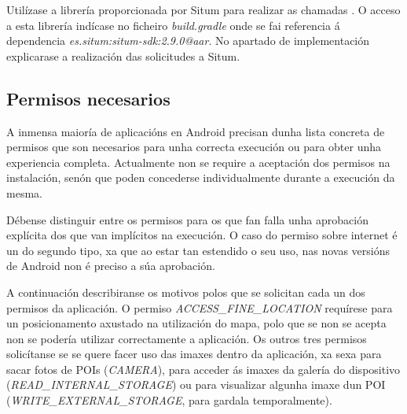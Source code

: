 Utilízase a librería proporcionada por Situm para realizar as chamadas \cite{situmDevelopers}. O acceso a esta librería indícase no ficheiro \emph{build.gradle} onde se fai referencia á dependencia \emph{es.situm:situm-sdk:2.9.0@aar}. No apartado de implementación explicarase a realización das solicitudes a Situm.

\subsection{Permisos necesarios}
A inmensa maioría de aplicacións en Android precisan dunha lista concreta de permisos que son necesarios para unha correcta execución ou para obter unha experiencia completa. Actualmente non se require a aceptación dos permisos na instalación, senón que poden concederse individualmente durante a execución da mesma.

Débense distinguir entre os permisos para os que fan falla unha aprobación explícita dos que van implícitos na execución. O caso do permiso sobre internet é un do segundo tipo, xa que ao estar tan estendido o seu uso, nas novas versións de Android non é preciso a súa aprobación.

A continuación describiranse os motivos polos que se solicitan cada un dos permisos da aplicación. O permiso \emph{ACCESS\_FINE\_LOCATION} requírese para un posicionamento axustado na utilización do mapa, polo que se non se acepta non se podería utilizar correctamente a aplicación. Os outros tres permisos solicítanse se se quere facer uso das imaxes dentro da aplicación, xa sexa para sacar fotos de POIs (\emph{CAMERA}), para acceder ás imaxes da galería do dispositivo (\emph{READ\_INTERNAL\_STORAGE}) ou para visualizar algunha imaxe dun POI (\emph{WRITE\_EXTERNAL\_STORAGE}, para gardala temporalmente).
